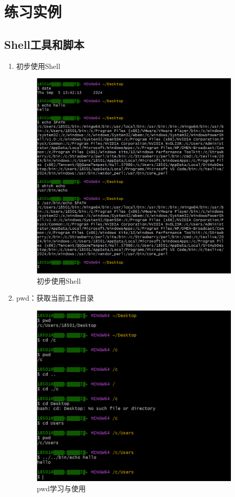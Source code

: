 \documentclass{ctexart}
\begin{document}
\section{练习实例}

\subsection{Shell工具和脚本}
\begin{enumerate}

    \item 初步使用Shell
    \begin{figure}[H]
       \centering
       \includegraphics[width=10cm]{7a9723eb10f53b641242870e5b413206.png}
       \caption{初步使用Shell}
       \label{fig:1}
   \end{figure}

   \item pwd：获取当前工作目录
   \begin{figure}[H]
      \centering
      \includegraphics[width=10cm]{283139ae649fc8096bbc940266895d08.png}
      \caption{pwd学习与使用}
      \label{fig:2}
  \end{figure}


\end{enumerate}
\end{document}
